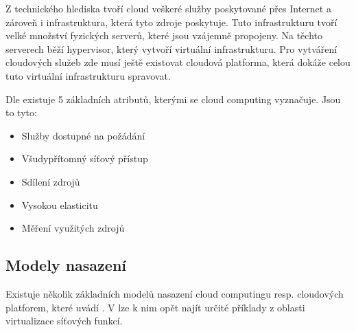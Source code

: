 Z technického hlediska tvoří cloud veškeré služby poskytované přes Internet a zároveň i infrastruktura, která tyto zdroje poskytuje. Tuto infrastrukturu tvoří velké množství fyzických serverů, které jsou vzájemně propojeny. Na těchto serverech běží hypervisor, který vytvoří virtuální infrastrukturu. Pro vytváření cloudových služeb zde musí ještě existovat cloudová platforma, která dokáže celou tuto virtuální infrastrukturu spravovat. \cite{Cloud_book}

Dle \cite{Cloud_book} existuje 5 základních atributů, kterými se cloud computing vyznačuje. Jsou to tyto:

\begin{itemize}
\item Služby dostupné na požádání
\item Všudypřítomný síťový přístup
\item Sdílení zdrojů
\item Vysokou elasticitu
\item Měření využitých zdrojů
\end{itemize}

\subsection{Modely nasazení}

Existuje několik základních modelů nasazení cloud computingu resp. cloudových platforem, které uvádí \cite{CloudSurvey}. V \cite{NFV_use_cases} lze k nim opět najít určité příklady z oblasti virtualizace síťových funkcí.

